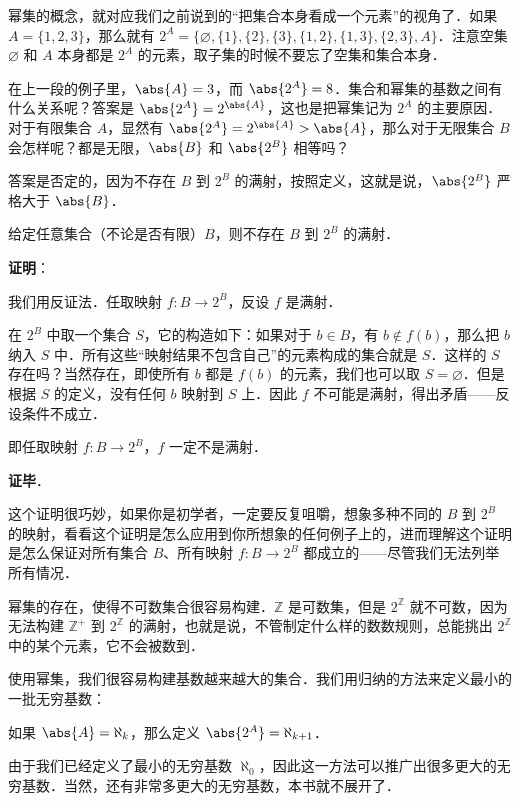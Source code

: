 幂集的概念，就对应我们之前说到的“把集合本身看成一个元素”的视角了．如果 $A=\{1,2,3\}$，那么就有 $2^A=\{\varnothing, \{1\}, \{2\}, \{3\}, \{1,2\}, \{1,3\}, \{2,3\}, A\}$．注意空集 $\varnothing$ 和 $A$ 本身都是 $2^A$ 的元素，取子集的时候不要忘了空集和集合本身．

在上一段的例子里，$\abs{A}=3$，而 $\abs{2^A}=8$．集合和幂集的基数之间有什么关系呢？答案是 $\abs{2^A}=2^{\abs{A}}$，这也是把幂集记为 $2^A$ 的主要原因．对于有限集合 $A$，显然有 $\abs{2^A}=2^{\abs{A}}>\abs{A}$，那么对于无限集合 $B$ 会怎样呢？都是无限，$\abs{B}$ 和 $\abs{2^B}$ 相等吗？

答案是否定的，因为不存在 $B$ 到 $2^B$ 的满射，按照定义，这就是说，$\abs{2^B}$ 严格大于 $\abs{B}$．

\begin{theorem}{}
给定任意集合（不论是否有限）$B$，则不存在 $B$ 到 $2^B$ 的满射．
\end{theorem}

\textbf{证明}：

我们用反证法．任取映射 $f:B\rightarrow 2^B$，反设 $f$ 是满射．

在 $2^B$ 中取一个集合 $S$，它的构造如下：如果对于 $b\in B$，有 $b\not\in f(b)$，那么把 $b$ 纳入 $S$ 中．所有这些“映射结果不包含自己”的元素构成的集合就是 $S$．这样的 $S$ 存在吗？当然存在，即使所有 $b$ 都是 $f(b)$ 的元素，我们也可以取 $S=\varnothing$．但是根据 $S$ 的定义，没有任何 $b$ 映射到 $S$ 上．因此 $f$ 不可能是满射，得出矛盾——反设条件不成立．

即任取映射 $f:B\rightarrow 2^B$，$f$ 一定不是满射．

\textbf{证毕}．

这个证明很巧妙，如果你是初学者，一定要反复咀嚼，想象多种不同的 $B$ 到 $2^B$ 的映射，看看这个证明是怎么应用到你所想象的任何例子上的，进而理解这个证明是怎么保证对所有集合 $B$、所有映射 $f:B\rightarrow 2^B$ 都成立的——尽管我们无法列举所有情况．

幂集的存在，使得不可数集合很容易构建．$\mathbb{Z}$ 是可数集，但是 $2^{\mathbb{Z}}$ 就不可数，因为无法构建 $\mathbb{Z}^+$ 到 $2^{\mathbb{Z}}$ 的满射，也就是说，不管制定什么样的数数规则，总能挑出 $2^{\mathbb{Z}}$ 中的某个元素，它不会被数到．

使用幂集，我们很容易构建基数越来越大的集合．我们用归纳的方法来定义最小的一批无穷基数：
\begin{definition}{}
如果 $\abs{A}=\aleph_k$，那么定义 $\abs{2^A}=\aleph_{k+1}$．
\end{definition}
由于我们已经定义了最小的无穷基数 $\aleph_0$，因此这一方法可以推广出很多更大的无穷基数．当然，还有非常多更大的无穷基数，本书就不展开了．

